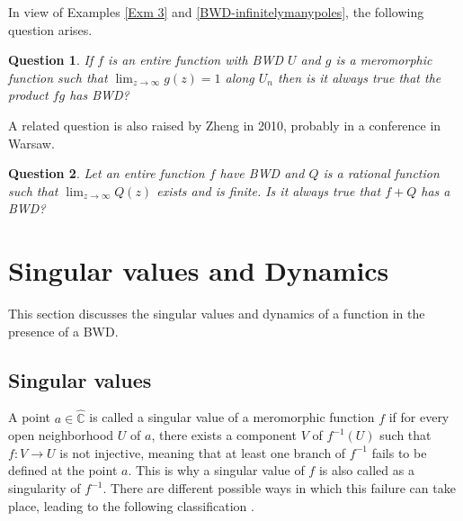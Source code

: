 \documentclass[11pt,a4paper]{article}
\newtheorem{Question}{Question}
\begin{document}
In view of Examples \ref{Exm 3} and \ref{BWD-infinitelymanypoles}, the following question arises.
\begin{Question}
	If $f$ is an entire function with BWD $U$ and $g$ is a meromorphic function such that $\lim_{z \to \infty}g(z)=1$ along $U_n$ then is it always true that the product $fg$ has BWD?
	\end{Question}
	
A related question is also raised by Zheng in 2010, probably in a conference in Warsaw.
\begin{Question}
Let an entire function $f$ have BWD and $Q$ is a rational function such that $\lim_{z \to \infty} Q(z)$ exists and is finite. Is it always true that $f+Q$ has a BWD? 
\end{Question}


	\section{Singular values and Dynamics}
	This section discusses the singular values and dynamics of a function in the presence of a BWD.
	
	\subsection{Singular values}\label{singularvalues-section}
	 A point $a\in\widehat{\mathbb C}$ is called a singular value of a meromorphic function $f$ if for every open neighborhood $U$ of $a$, there exists a component $V$ of $f^{-1}(U)$ such that $f:V\to U$ is not injective, meaning that at least one branch of $f^{-1}$ fails to be defined at the point $a$. This is why a singular value of $f$ is also called as a singularity of $f^{-1}$. There are different possible ways in which this failure can take place, leading to the following classification  \cite{BergEreme 1995}. 
	
\end{document}
